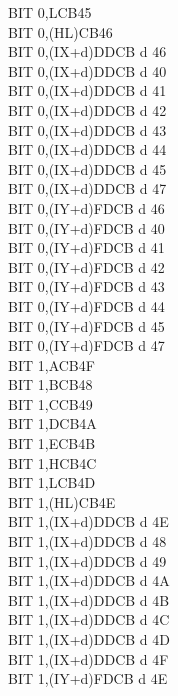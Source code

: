 \begin{multicols}{3}
{\begin{tabbing}
        BIT 0,L\>CB45\\
        BIT 0,(HL)\>CB46\\
        BIT 0,(IX+d)\>DDCB d 46\\
        BIT 0,(IX+d)\UNDOC\>DDCB d 40\\
        BIT 0,(IX+d)\UNDOC\>DDCB d 41\\
        BIT 0,(IX+d)\UNDOC\>DDCB d 42\\
        BIT 0,(IX+d)\UNDOC\>DDCB d 43\\
        BIT 0,(IX+d)\UNDOC\>DDCB d 44\\
        BIT 0,(IX+d)\UNDOC\>DDCB d 45\\
        BIT 0,(IX+d)\UNDOC\>DDCB d 47\\
        BIT 0,(IY+d)\>FDCB d 46\\
        BIT 0,(IY+d)\UNDOC\>FDCB d 40\\
        BIT 0,(IY+d)\UNDOC\>FDCB d 41\\
        BIT 0,(IY+d)\UNDOC\>FDCB d 42\\
        BIT 0,(IY+d)\UNDOC\>FDCB d 43\\
        BIT 0,(IY+d)\UNDOC\>FDCB d 44\\
        BIT 0,(IY+d)\UNDOC\>FDCB d 45\\
        BIT 0,(IY+d)\UNDOC\>FDCB d 47\\
        BIT 1,A\>CB4F\\
        BIT 1,B\>CB48\\
        BIT 1,C\>CB49\\
        BIT 1,D\>CB4A\\
        BIT 1,E\>CB4B\\
        BIT 1,H\>CB4C\\
        BIT 1,L\>CB4D\\
        BIT 1,(HL)\>CB4E\\
        BIT 1,(IX+d)\>DDCB d 4E\\
        BIT 1,(IX+d)\UNDOC\>DDCB d 48\\
        BIT 1,(IX+d)\UNDOC\>DDCB d 49\\
        BIT 1,(IX+d)\UNDOC\>DDCB d 4A\\
        BIT 1,(IX+d)\UNDOC\>DDCB d 4B\\
        BIT 1,(IX+d)\UNDOC\>DDCB d 4C\\
        BIT 1,(IX+d)\UNDOC\>DDCB d 4D\\
        BIT 1,(IX+d)\UNDOC\>DDCB d 4F\\
        BIT 1,(IY+d)\>FDCB d 4E\\

\end{tabbing}}
\end{multicols}
